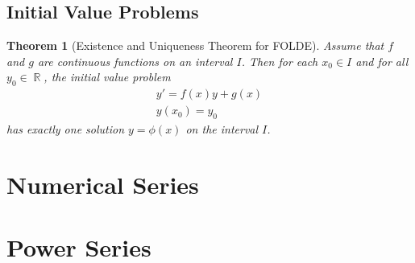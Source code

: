 \documentclass[10pt]{article}
\DeclareMathOperator{\R}{{\mathbb{R}}}
\theoremstyle{break}
\newtheorem{thm}{Theorem}[subsection]
\begin{document}
\subsection{Initial Value Problems}
\begin{thm}[Existence and Uniqueness Theorem for FOLDE]
    Assume that $f$ and $g$ are continuous functions on an interval $I$. Then for each $x_0 \in I$ and for all $y_0 \in \R$, the initial value problem
    \begin{align*}
        y' = f(x)y + g(x)\\
        y(x_0) = y_0
    \end{align*}
    has exactly one solution $y = \phi(x)$ on the interval $I$.
\end{thm}


\newpage


\section{Numerical Series}



\newpage




\section{Power Series}
\end{document}
